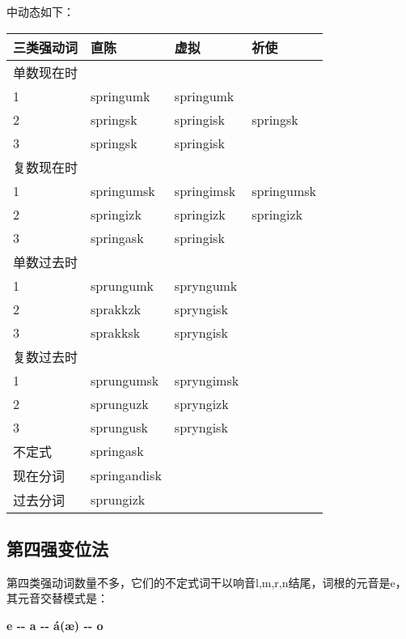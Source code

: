 中动态如下：

\begin{longtable}{llll}
  \toprule
  三类强动词 & 直陈         & 虚拟       & 祈使       \\
  \midrule
  \endhead
  \bottomrule
  \endfoot
  单数现在时 &              &            &            \\
  1          & springumk    & springumk  &            \\
  2          & springsk     & springisk  & springsk   \\
  3          & springsk     & springisk  &            \\
  复数现在时 &              &            &            \\
  1          & springumsk   & springimsk & springumsk \\
  2          & springizk    & springizk  & springizk  \\
  3          & springask    & springisk  &            \\
  单数过去时 &              &            &            \\
  1          & sprungumk    & spryngumk  &            \\
  2          & sprakkzk     & spryngisk  &            \\
  3          & sprakksk     & spryngisk  &            \\
  复数过去时 &              &            &            \\
  1          & sprungumsk   & spryngimsk &            \\
  2          & sprunguzk    & spryngizk  &            \\
  3          & sprungusk    & spryngisk  &            \\
  不定式     & springask    &            &            \\
  现在分词   & springandisk &            &            \\
  过去分词   & sprungizk    &            &            \\
\end{longtable}

\subsection{第四强变位法}\label{第四强变位法}

第四类强动词数量不多，它们的不定式词干以响音l,m,r,n结尾，词根的元音是e，其元音交替模式是：

\textbf{e -\/- a -\/- á(æ) -\/- o}


